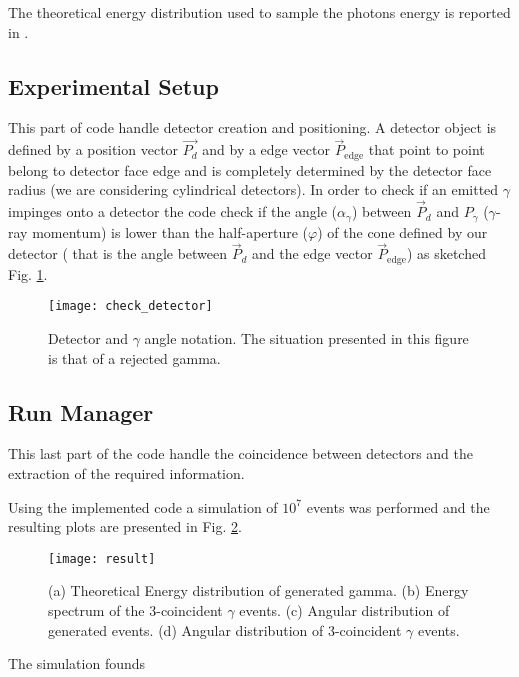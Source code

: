 The theoretical energy distribution used to sample the photons energy is reported in \cite{ore1949three}.

\subsection*{Experimental Setup}

This part of code handle detector creation and positioning. A detector object is defined by a position vector $\vec{P_d}$ and by a edge vector $\vec{P}_{\text{edge}}$ that point to point belong to detector face edge and is completely determined by the detector face radius (we are considering cylindrical detectors). In order to check if an emitted $\gamma$ impinges onto a detector the code check if the angle ($\alpha_\gamma$) between $\vec{P}_d$ and $P_\gamma$ ($\gamma$-ray momentum) is lower than the half-aperture ($\varphi$) of the cone defined by our detector ( that is the angle between $\vec{P}_d$ and the edge vector $\vec{P}_{\text{edge}}$) as sketched Fig. \ref{Fig: angle det check}.

\begin{figure}[H]
\centering
\texttt{[image: check\_detector]}
\caption{Detector and $\gamma$ angle notation. The situation presented in this figure is that of a rejected gamma.}
\label{Fig: angle det check}
\end{figure}


\subsection*{Run Manager}

This last part of the code handle the coincidence between detectors and the extraction of the required information.

Using the implemented code a simulation of $10^7$ events was performed and the resulting plots are presented in Fig. \ref{Fig: simulation result}.

\begin{figure}[H]
\centering
\texttt{[image: result]}
\caption{(a) Theoretical Energy distribution of generated gamma. (b) Energy spectrum of the 3-coincident $\gamma$ events. (c) Angular distribution of generated events. (d) Angular distribution of 3-coincident $\gamma$ events.}
\label{Fig: simulation result}
\end{figure}

The simulation founds 
